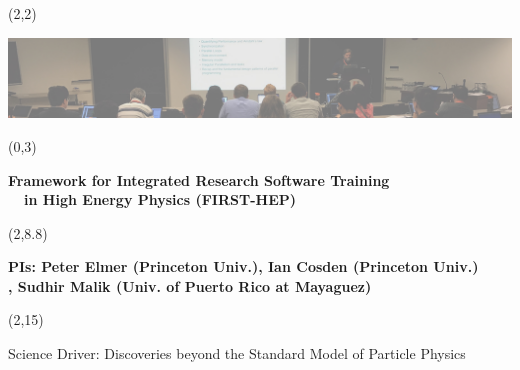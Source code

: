 \documentclass[final]{beamer}
\begin{document}
\begin{frame}{} 

\begin{textblock}{80.0}(2,2)
\begin{center}
\includegraphics[width=1.00\textwidth]{images/codashep2017-mattson-class-IMG_6311-slice.JPG}
\end{center}
\end{textblock}

\begin{textblock}{84.0}(0,3)
\begin{center}
\begin{Huge}
\textbf{
Framework for Integrated Research Software Training \\
~~in High Energy Physics (FIRST-HEP)
}
\end{Huge}
\end{center}
\end{textblock}

\begin{textblock}{84.0}(2,8.8)
\begin{center}
\begin{Large}
\textbf{
PIs: Peter Elmer (Princeton Univ.), Ian Cosden (Princeton Univ.)\\ 
, Sudhir Malik (Univ. of Puerto Rico at Mayaguez)
}
\end{Large}
\end{center}
\end{textblock}


\begin{textblock}{80.0}(2,15)
\begin{block}{Science Driver: Discoveries beyond the Standard Model of Particle Physics}


\end{block}
\end{textblock}
\end{frame}
\end{document}
